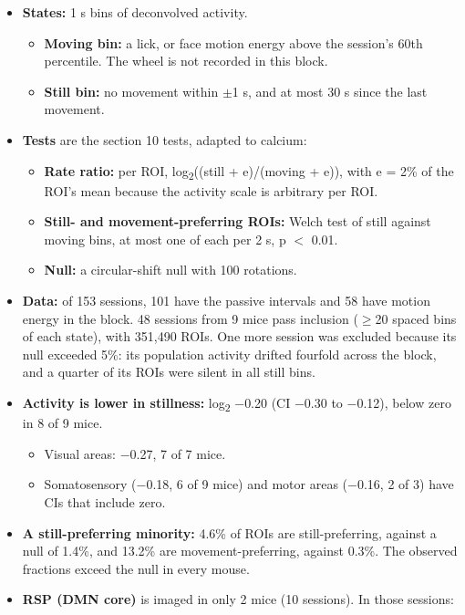 \documentclass[10pt,a4paper]{article}
\begin{document}
\begin{itemize}
\item \textbf{States:} 1 s bins of deconvolved activity. 
\begin{itemize}
\item \textbf{Moving bin:} a lick, or face motion energy above the session's 60th percentile. The wheel is not recorded in this block.
\item \textbf{Still bin:} no movement within $\pm$1 s, and at most 30 s since the last movement.
\end{itemize}
\item \textbf{Tests} are the section 10 tests, adapted to calcium: 
\begin{itemize}
\item \textbf{Rate ratio:} per ROI, log\textsubscript{2}((still + e)/(moving + e)), with e = 2\% of the ROI's mean because the activity scale is arbitrary per ROI.
\item \textbf{Still- and movement-preferring ROIs:} Welch test of still against moving bins, at most one of each per 2 s, p $<$ 0.01.
\item \textbf{Null:} a circular-shift null with 100 rotations.
\end{itemize}
\item \textbf{Data:} of 153 sessions, 101 have the passive intervals and 58 have motion energy in the block. 48 sessions from 9 mice pass inclusion ($\geq$20 spaced bins of each state), with 351,490 ROIs. One more session was excluded because its null exceeded 5\%: its population activity drifted fourfold across the block, and a quarter of its ROIs were silent in all still bins.
\item \textbf{Activity is lower in stillness:} log\textsubscript{2} $-$0.20 (CI $-$0.30 to $-$0.12), below zero in 8 of 9 mice. 
\begin{itemize}
\item Visual areas: $-$0.27, 7 of 7 mice.
\item Somatosensory ($-$0.18, 6 of 9 mice) and motor areas ($-$0.16, 2 of 3) have CIs that include zero.
\end{itemize}
\item \textbf{A still-preferring minority:} 4.6\% of ROIs are still-preferring, against a null of 1.4\%, and 13.2\% are movement-preferring, against 0.3\%. The observed fractions exceed the null in every mouse.
\item \textbf{RSP (DMN core)} is imaged in only 2 mice (10 sessions). In those sessions: 
\begin{itemize}

\end{itemize}
\end{itemize}
\end{document}
